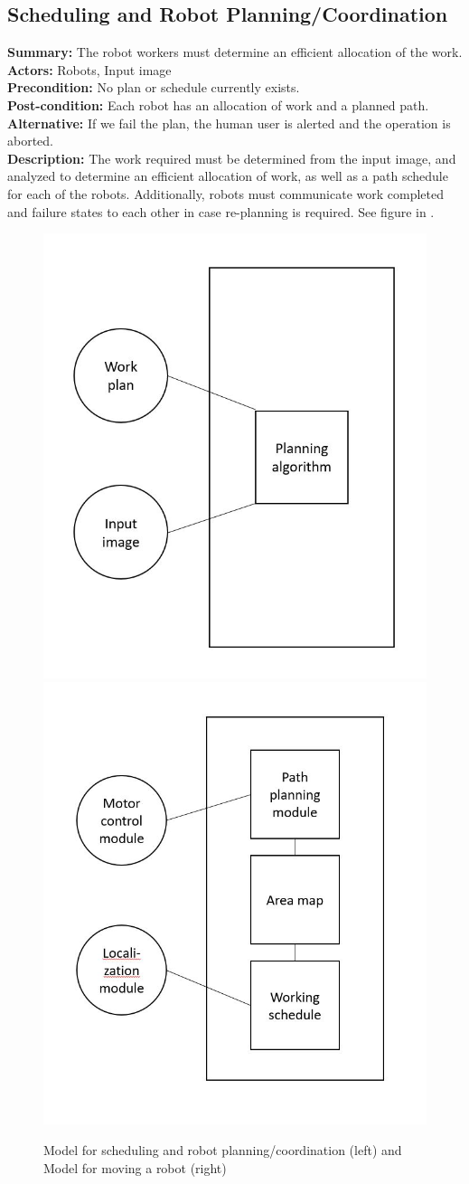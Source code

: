 \subsection{Scheduling and Robot Planning/Coordination}
\textbf{Summary:} The robot workers must determine an efficient allocation of the work. \\
\textbf{Actors:} Robots, Input image \\
\textbf{Precondition:} No plan or schedule currently exists. \\
\textbf{Post-condition:} Each robot has an allocation of work and a planned path. \\
\textbf{Alternative:} If we fail the plan, the human user is alerted and the operation is aborted. \\
\textbf{Description:} The work required must be determined from the input image, and analyzed to determine an efficient allocation of work, as well as a path schedule for each of the robots. Additionally, robots must communicate work completed and failure states to each other in case re-planning is required. See figure in .\\

\begin{figure}
 \centering
  \includegraphics[width=0.48\columnwidth]{figs/use_case-planning_coordination.jpg}
	\includegraphics[width=0.48\columnwidth]{figs/use_case-moving.jpg}
	\caption{Model for scheduling and robot planning/coordination (left) and Model for moving a robot (right)}
 \label{fig:scheduling_moving}
\end{figure}

